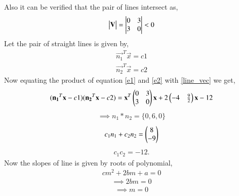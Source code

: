 \documentclass[journal,12pt,twocolumn]{IEEEtran}
\begin{document}
Also it can be verified that the pair of lines intersect as,
\begin{align}
\begin{vmatrix}\mathbf{V}\end{vmatrix} = \begin{vmatrix}0&3\\3&0\end{vmatrix} <0 
\end{align} 
Let the pair of straight lines is given by,
\begin{align}
\vec{n_1}^T\vec{x} = c1
\label{e1}
\end{align}
\begin{align}
\vec{n_2}^T\vec{x} = c2
\label{e2}
\end{align}
Now equating the product of equation \eqref{e1} and \eqref{e2} with \eqref{line_vec} we get,
\begin{align}
(\mathbf{n_1}^T\mathbf{x} - c1)(\mathbf{n_2}^T\mathbf{x} - c2) = \mathbf{x}^T\begin{pmatrix}0&3\\3&0\end{pmatrix}\mathbf{x} + 2\begin{pmatrix}-4& \frac{9}{2}\end{pmatrix}\mathbf{x} - 12 
\end{align}
\begin{align}
\implies n_1 * n_2 = \{0,6,0\}
\end{align}
\begin{align}
c_1n_1+c_2n_2 = \begin{pmatrix}8\\-9\end{pmatrix}
\end{align}
\begin{align}
c_1c_2 = -12.
\end{align}
Now the slopes of line is given by roots of polynomial,
\begin{align}
cm^2 + 2bm + a = 0
\end{align} 
\begin{align}
\implies 2bm = 0
\end{align}
\begin{align}
\implies m = 0
\end{align}
\end{document}
